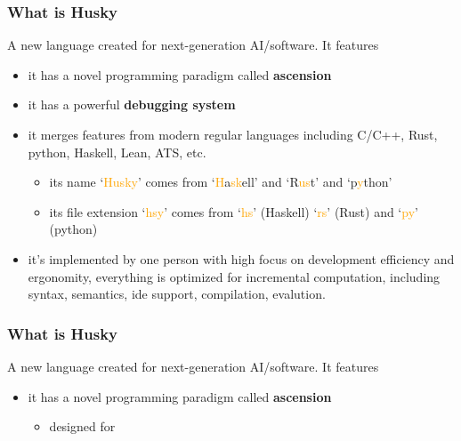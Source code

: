 \documentclass{beamer}   	%
\theoremstyle{definition}
\begin{document}
\begin{frame}
\frametitle{What is Husky}
A new language created for next-generation AI/software. It features
\begin{itemize}
	\item it has a novel programming paradigm called \textbf{ascension}
	\item it has a powerful \textbf{debugging system}
	\item it merges features from modern regular languages including C/C++, Rust, python, Haskell, Lean, ATS, etc.
	\begin{itemize}
		\item its name `\textcolor{orange}{Husky}' comes from `\textcolor{orange}{H}a\textcolor{orange}{sk}ell' and `R\textcolor{orange}{us}t' and `p\textcolor{orange}{y}thon'
		\item its file extension `\textcolor{orange}{hsy}' comes from `\textcolor{orange}{hs}' (Haskell) `\textcolor{orange}{rs}' (Rust) and `\textcolor{orange}{py}' (python)
	\end{itemize}
	\item it's implemented by one person with high focus on development efficiency and ergonomity, everything is optimized for incremental computation, including syntax, semantics, ide support, compilation, evalution.
\end{itemize}
\end{frame}

\begin{frame}
\frametitle{What is Husky}
A new language created for next-generation AI/software. It features
\begin{itemize}
	\item it has a novel programming paradigm called \textbf{ascension}
	\begin{itemize}
		\item designed for 
	\end{itemize}
\end{itemize}
\end{frame}
\end{document}
